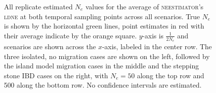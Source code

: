 \begin{landscape}
\begin{figure}[ht]
\centering
{}
\caption[ ~~~ - All replicate estimated $N_e$ values for the average of \textsc{neestimator}'s \textsc{ldne} at both temporal sampling points across all scenarios.]{All replicate estimated $N_e$ values for the average of \textsc{neestimator}'s \textsc{ldne} at both temporal sampling points across all scenarios. True $N_e$ is shown by the horizontal green lines, point estimates in red with their average indicate by the orange square. $y$-axis is $\frac{1}{2 N_e}$ and scenarios are shown across the $x$-axis, labeled in the center row. The three isolated, no migration cases are shown on the left, followed by the island model migration cases in the middle and the stepping stone IBD cases on the right, with $N_e = 50$ along the top row and 500 along the bottom row. No confidence intervals are estimated.}
\label{fig:supp_avg2}
\end{figure}



\end{landscape}

